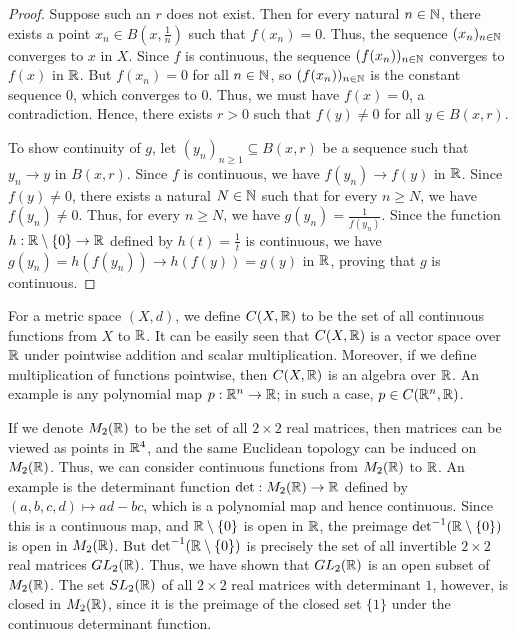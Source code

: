 \begin{proof}
    Suppose such an $r$ does not exist. Then for every natural $n \in \mathbb{N}$, there exists a point $x_{n} \in B(x, \frac{1}{n})$ such that $f(x_{n}) = 0$. Thus, the sequence $(x_{n})_{n \in \mathbb{N}}$ converges to $x$ in $X$. Since $f$ is continuous, the sequence $(f(x_{n}))_{n \in \mathbb{N}}$ converges to $f(x)$ in $\mathbb{R}$. But $f(x_{n}) = 0$ for all $n \in \mathbb{N}$, so $(f(x_{n}))_{n \in \mathbb{N}}$ is the constant sequence $0$, which converges to $0$. Thus, we must have $f(x) = 0$, a contradiction. Hence, there exists $r > 0$ such that $f(y) \neq 0$ for all $y \in B(x,r)$.

    To show continuity of $g$, let $(y_{n})_{n \geq 1} \subseteq B(x,r)$ be a sequence such that $y_{n} \to y$ in $B(x,r)$. Since $f$ is continuous, we have $f(y_{n}) \to f(y)$ in $\mathbb{R}$. Since $f(y) \neq 0$, there exists a natural $N \in \mathbb{N}$ such that for every $n \geq N$, we have $f(y_{n}) \neq 0$. Thus, for every $n \geq N$, we have $g(y_{n}) = \frac{1}{f(y_{n})}$. Since the function $h : \mathbb{R} \setminus \{0\} \to \mathbb{R}$ defined by $h(t) = \frac{1}{t}$ is continuous, we have $g(y_{n}) = h(f(y_{n})) \to h(f(y)) = g(y)$ in $\mathbb{R}$, proving that $g$ is continuous.
\end{proof}

For a metric space $(X,d)$, we define $C(X,\mathbb{R})$ to be the set of all continuous functions from $X$ to $\mathbb{R}$. It can be easily seen that $C(X,\mathbb{R})$ is a vector space over $\mathbb{R}$ under pointwise addition and scalar multiplication. Moreover, if we define multiplication of functions pointwise, then $C(X,\mathbb{R})$ is an algebra over $\mathbb{R}$. An example is any polynomial map $p:\mathbb{R}^{n} \to \mathbb{R}$; in such a case, $p \in C(\mathbb{R}^{n},\mathbb{R})$.

If we denote $M_{2}(\mathbb{R})$ to be the set of all $2 \times 2$ real matrices, then matrices can be viewed as points in $\mathbb{R}^{4}$, and the same Euclidean topology can be induced on $M_{2}(\mathbb{R})$. Thus, we can consider continuous functions from $M_{2}(\mathbb{R})$ to $\mathbb{R}$. An example is the determinant function $\det : M_{2}(\mathbb{R}) \to \mathbb{R}$ defined by $(a,b,c,d) \mapsto ad-bc$, which is a polynomial map and hence continuous. Since this is a continuous map, and $\mathbb{R}\setminus \{0\}$ is open in $\mathbb{R}$, the preimage $\det^{-1}(\mathbb{R} \setminus \{0\})$ is open in $M_{2}(\mathbb{R})$. But $\det^{-1}(\mathbb{R} \setminus \{0\})$ is precisely the set of all invertible $2 \times 2$ real matrices $GL_{2}(\mathbb{R})$. Thus, we have shown that $GL_{2}(\mathbb{R})$ is an open subset of $M_{2}(\mathbb{R})$. The set $SL_{2}(\mathbb{R})$ of all $2 \times 2$ real matrices with determinant $1$, however, is closed in $M_{2}(\mathbb{R})$, since it is the preimage of the closed set $\{1\}$ under the continuous determinant function.

